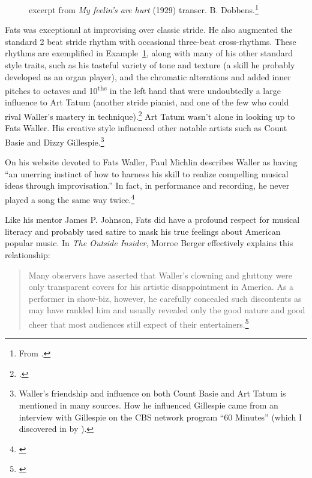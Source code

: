 \documentclass[11pt]{report}
\begin{document}
	
		\begin{figure}[ht]
			\centering
			\begin{minipage}{\textwidth}
				
				\caption{excerpt from \emph{My feelin's are hurt} (1929) transcr. B. Dobbens.\protect\footnote{\scriptsize From \cite[]{grove-book:waller}.}}
				\label{fig:hurt}
				

				{%
\parindent 0pt
\ifx\preLilyPondExample \undefined
\else
  \expandafter\preLilyPondExample
\fi
\def\lilypondbook{}%

\ifx\postLilyPondExample \undefined
\else
  \expandafter\postLilyPondExample
\fi
}


			\end{minipage}
		\end{figure}

	Fats was exceptional at improvising over classic stride. He also augmented the standard 2 beat stride rhythm with occasional three-beat cross-rhythms. These rhythms are exemplified in Example~\ref{fig:hurt}, along with many of his other standard style traits, such as his tasteful variety of tone and texture (a skill he probably developed as an organ player), and the chromatic alterations and added inner pitches to octaves and 10\textsuperscript{ths} in the left hand that were undoubtedly a large influence to Art Tatum (another stride pianist, and one of the few who could rival Waller's mastery in technique).\footnote{\cite[40]{grove-book:waller}.} Art Tatum wasn't alone in looking up to Fats Waller. His creative style influenced other notable artists such as Count Basie and Dizzy Gillespie.\footnote{Waller's friendship and influence on both Count Basie and Art Tatum is mentioned in many sources. How he influenced Gillespie came from an interview with Gillespie on the CBS network program ``60 Minutes'' (which I discovered in  by \cite{transcriptions}).}

	On his website devoted to Fats Waller, Paul Michlin describes Waller as having ``an unerring instinct of how to harness his skill to realize compelling musical ideas through improvisation.'' In fact, in performance and recording, he never played a song the same way twice.\footnote{\cite{transcriptions}}

	\label{sec:respect}
	Like his mentor James P. Johnson, Fats did have a profound respect for musical literacy and probably used satire to mask his true feelings about American popular music. In \emph{The Outside Insider}, Morroe Berger effectively explains this relationship:
	\begin{quote}
		Many observers have asserted that Waller's clowning and gluttony were only transparent covers for his artistic disappointment in America. As a performer in show-biz, however, he carefully concealed such discontents as may have rankled him and usually revealed only the good nature and good cheer that most audiences still expect of their entertainers.\footnote{\cite[4]{outside-insider}}
	\end{quote}
\end{document}
